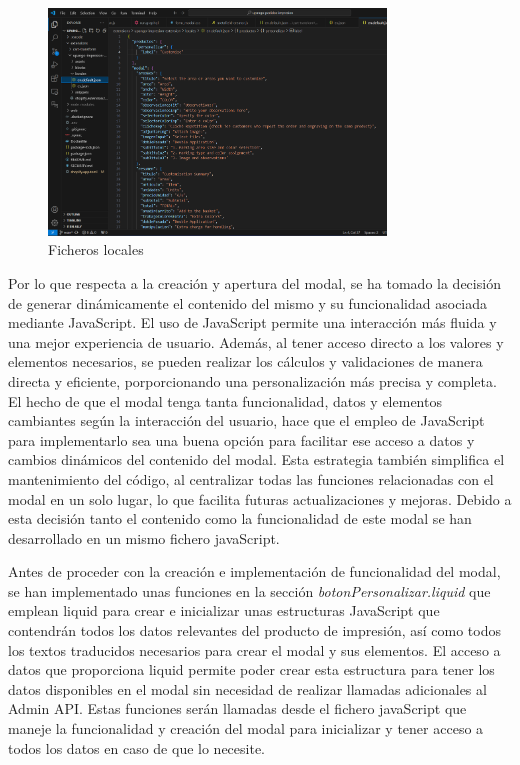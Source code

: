 \documentclass[12pt]{article}
\begin{document}
\begin{figure}[ht]
    \centering
    \includegraphics[width=0.8\textwidth]{imagenesUS1/locales.png}
    \caption{\label{fig:locales}Ficheros locales}
    \vspace{\fill}
\end{figure}

Por lo que respecta a la creación y apertura del modal, se ha tomado la decisión de generar dinámicamente el contenido del mismo y su funcionalidad
asociada mediante JavaScript. El uso de JavaScript permite una interacción más fluida y una mejor experiencia de usuario. Además, al tener acceso directo 
a los valores y elementos necesarios, se pueden realizar los cálculos y validaciones de manera directa y eficiente, porporcionando una personalización
más precisa y completa. El hecho de que el modal tenga tanta funcionalidad, datos y elementos cambiantes según la interacción del usuario, hace que 
el empleo de JavaScript para implementarlo sea una buena opción para facilitar ese acceso a datos y cambios dinámicos del contenido del modal.
Esta estrategia también simplifica el mantenimiento del código, al centralizar todas las funciones relacionadas con el modal en un solo lugar, lo que facilita
futuras actualizaciones y mejoras. Debido a esta decisión tanto el contenido como la funcionalidad de este modal se han desarrollado en un mismo fichero javaScript.

Antes de proceder con la creación e implementación de funcionalidad del modal, se han implementado unas funciones en la sección \textit{botonPersonalizar.liquid} que emplean liquid para crear e inicializar unas estructuras JavaScript que 
contendrán todos los datos relevantes del producto de impresión, así como todos los textos traducidos necesarios para crear el modal y sus elementos. El acceso a datos que proporciona liquid permite poder crear 
esta estructura para tener los datos disponibles en el modal sin necesidad de realizar llamadas adicionales al Admin API. Estas funciones serán llamadas desde el fichero 
javaScript que maneje la funcionalidad y creación del modal para inicializar y tener acceso a todos los datos en caso de que lo necesite.
\end{document}
